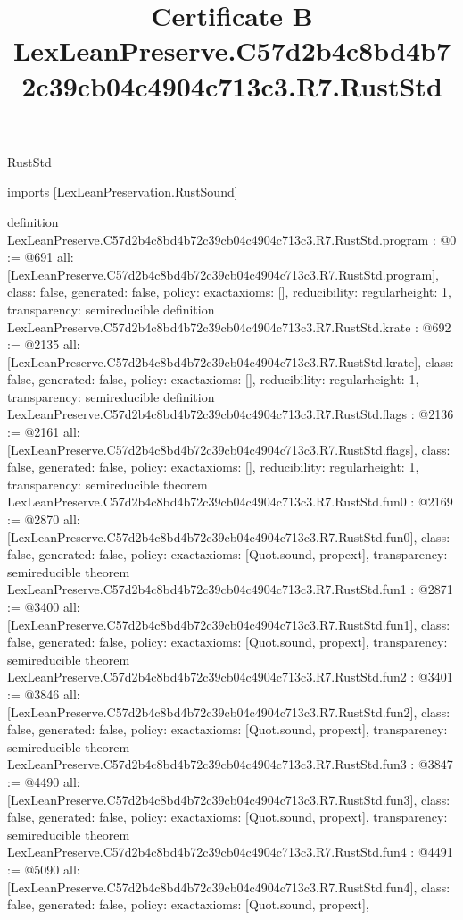 \begin{lexlean}{RustStd}
\title{Certificate B LexLeanPreserve.C57d2b4c8bd4b72c39cb04c4904c713c3.R7.RustStd}
\begin{coremodule}
imports [LexLeanPreservation.RustSound]

definition LexLeanPreserve.C57d2b4c8bd4b72c39cb04c4904c713c3.R7.RustStd.program : @0 := @691 {
  all: [LexLeanPreserve.C57d2b4c8bd4b72c39cb04c4904c713c3.R7.RustStd.program],
  class: false,
  generated: false,
  policy: exact{axioms: []},
  reducibility: regular{height: 1},
  transparency: semireducible
}
definition LexLeanPreserve.C57d2b4c8bd4b72c39cb04c4904c713c3.R7.RustStd.krate : @692 := @2135 {
  all: [LexLeanPreserve.C57d2b4c8bd4b72c39cb04c4904c713c3.R7.RustStd.krate],
  class: false,
  generated: false,
  policy: exact{axioms: []},
  reducibility: regular{height: 1},
  transparency: semireducible
}
definition LexLeanPreserve.C57d2b4c8bd4b72c39cb04c4904c713c3.R7.RustStd.flags : @2136 := @2161 {
  all: [LexLeanPreserve.C57d2b4c8bd4b72c39cb04c4904c713c3.R7.RustStd.flags],
  class: false,
  generated: false,
  policy: exact{axioms: []},
  reducibility: regular{height: 1},
  transparency: semireducible
}
theorem LexLeanPreserve.C57d2b4c8bd4b72c39cb04c4904c713c3.R7.RustStd.fun0 : @2169 := @2870 {
  all: [LexLeanPreserve.C57d2b4c8bd4b72c39cb04c4904c713c3.R7.RustStd.fun0],
  class: false,
  generated: false,
  policy: exact{axioms: [Quot.sound, propext]},
  transparency: semireducible
}
theorem LexLeanPreserve.C57d2b4c8bd4b72c39cb04c4904c713c3.R7.RustStd.fun1 : @2871 := @3400 {
  all: [LexLeanPreserve.C57d2b4c8bd4b72c39cb04c4904c713c3.R7.RustStd.fun1],
  class: false,
  generated: false,
  policy: exact{axioms: [Quot.sound, propext]},
  transparency: semireducible
}
theorem LexLeanPreserve.C57d2b4c8bd4b72c39cb04c4904c713c3.R7.RustStd.fun2 : @3401 := @3846 {
  all: [LexLeanPreserve.C57d2b4c8bd4b72c39cb04c4904c713c3.R7.RustStd.fun2],
  class: false,
  generated: false,
  policy: exact{axioms: [Quot.sound, propext]},
  transparency: semireducible
}
theorem LexLeanPreserve.C57d2b4c8bd4b72c39cb04c4904c713c3.R7.RustStd.fun3 : @3847 := @4490 {
  all: [LexLeanPreserve.C57d2b4c8bd4b72c39cb04c4904c713c3.R7.RustStd.fun3],
  class: false,
  generated: false,
  policy: exact{axioms: [Quot.sound, propext]},
  transparency: semireducible
}
theorem LexLeanPreserve.C57d2b4c8bd4b72c39cb04c4904c713c3.R7.RustStd.fun4 : @4491 := @5090 {
  all: [LexLeanPreserve.C57d2b4c8bd4b72c39cb04c4904c713c3.R7.RustStd.fun4],
  class: false,
  generated: false,
  policy: exact{axioms: [Quot.sound, propext]},
}
\end{coremodule}
\end{lexlean}
